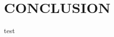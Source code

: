 \documentclass[letterpaper, 10 pt, conference]{ieeeconf}  %
\begin{document}
\section{CONCLUSION}



\begin{thebibliography}{99}
    test


\end{thebibliography}
\end{document}
